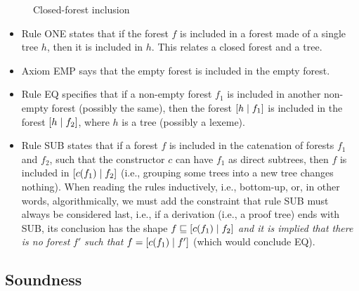\begin{figure}[t]
\caption{Closed\hyp{}forest inclusion\label{x_tree_matching_def}}
\end{figure}
\begin{itemize}

  \item Rule \textsf{ONE} states that if the forest \(f\) is included
    in a forest made of a single tree \(h\), then it is included in
    \(h\). This relates a closed forest and a tree.

  \item Axiom \textsf{EMP} says that the empty forest is included in
    the empty forest.

  \item Rule \textsf{EQ} specifies that if a non\hyp{}empty forest
    \(f_1\) is included in another non\hyp{}empty forest (possibly the
    same), then the forest \([{h}\mid{f_1}]\) is included in the forest
    \([{h}\mid{f_2}]\), where \(h\) is a tree (possibly a lexeme).

  \item Rule \textsf{SUB} states that if a forest \(f\) is included in
    the catenation of forests \(f_1\) and \(f_2\), such that the
    constructor \(c\) can have \(f_1\) as direct subtrees, then \(f\)
    is included in \([{c(f_1)}\mid{f_2}]\) (i.e., grouping some trees
    into a new tree changes nothing). When reading the rules
    inductively, i.e., bottom\hyp{}up, or, in other words,
    algorithmically, we must add the constraint that rule \textsf{SUB}
    must always be considered last, i.e., if a derivation (i.e., a
    proof tree) ends with \textsf{SUB}, its conclusion has the shape
    \(f \sqsubseteq [{c(f_1)}\mid{f_2}]\) \emph{and it is implied that
      there is no forest} \(f'\) \emph{such that} \(f =
    [{c(f_1)}\mid{f'}]\) (which would conclude \textsf{EQ}).

\end{itemize}

\subsection{Soundness}

